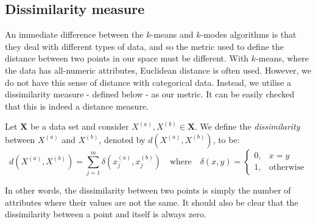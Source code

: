 \subsection{Dissimilarity measure}\label{subsec:dissim}

An immediate difference between the \(k\)-means and \(k\)-modes algorithms is 
that they deal with different types of data, and so the metric used to define 
the distance between two points in our space must be different. With 
\(k\)-means, where the data has all-numeric attributes, Euclidean distance is 
often used. However, we do not have this sense of distance with categorical 
data. Instead, we utilise a dissimilarity measure - defined below - as our 
metric. It can be easily checked that this is indeed a distance measure.\\

\begin{definition}\label{def:dissim}
	Let $\textbf{X}$ be a data set and consider $X^{(a)}, X^{(b)} \in 
    \textbf{X}$. We define the \emph{dissimilarity} between $X^{(a)}$ and 
    $X^{(b)}$, denoted by \(d(X^{(a)}, X^{(b)})\), to be:
	\[
	d(X^{(a)}, X^{(b)}) = \sum_{j=1}^{m} \delta(x_j^{(a)}, x_j^{(b)}) \quad
	\text{where} \quad \delta(x, y) = \begin{cases}
                                        0, & x = y \\
					                    1, & \text{otherwise}
					                  \end{cases}
	\]

    In other words, the dissimilarity between two points is simply the number of
    attributes where their values are not the same. It should also be clear that
    the dissimilarity between a point and itself is always zero.
\end{definition}



